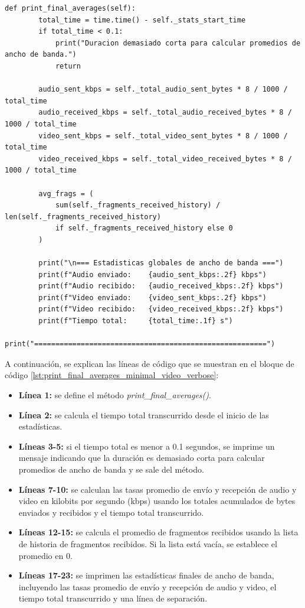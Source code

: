 \begin{lstlisting}[style=pythonstyle, caption={Método print\_final\_averages() de \textit{Minimal\_Video\_verbose}}, label={lst:print_final_averages_minimal_video_verbose}]
def print_final_averages(self):
        total_time = time.time() - self._stats_start_time
        if total_time < 0.1:
            print("Duracion demasiado corta para calcular promedios de ancho de banda.")
            return

        audio_sent_kbps = self._total_audio_sent_bytes * 8 / 1000 / total_time
        audio_received_kbps = self._total_audio_received_bytes * 8 / 1000 / total_time
        video_sent_kbps = self._total_video_sent_bytes * 8 / 1000 / total_time
        video_received_kbps = self._total_video_received_bytes * 8 / 1000 / total_time

        avg_frags = (
            sum(self._fragments_received_history) / len(self._fragments_received_history)
            if self._fragments_received_history else 0
        )

        print("\n=== Estadisticas globales de ancho de banda ===")
        print(f"Audio enviado:    {audio_sent_kbps:.2f} kbps")
        print(f"Audio recibido:   {audio_received_kbps:.2f} kbps")
        print(f"Video enviado:    {video_sent_kbps:.2f} kbps")
        print(f"Video recibido:   {video_received_kbps:.2f} kbps")
        print(f"Tiempo total:     {total_time:.1f} s")
        print("=======================================================")
\end{lstlisting}
\vspace{\baselineskip}

A continuación, se explican las líneas de código que se muestran en el bloque de código \ref{lst:print_final_averages_minimal_video_verbose}:
\begin{itemize}
    \item \textbf{Línea 1:} se define el método \textit{print\_final\_averages()}.
    \item \textbf{Línea 2:} se calcula el tiempo total transcurrido desde el inicio de las estadísticas.
    \item \textbf{Líneas 3-5:} si el tiempo total es menor a 0.1 segundos, se imprime un mensaje indicando que la duración es demasiado corta para calcular promedios de ancho de banda y se sale del método.
    \item \textbf{Líneas 7-10:} se calculan las tasas promedio de envío y recepción de audio y video en kilobits por segundo (kbps) usando los totales acumulados de bytes enviados y recibidos y el tiempo total transcurrido.
    \item \textbf{Líneas 12-15:} se calcula el promedio de fragmentos recibidos usando la lista de historia de fragmentos recibidos. Si la lista está vacía, se establece el promedio en 0.
    \item \textbf{Líneas 17-23:} se imprimen las estadísticas finales de ancho de banda, incluyendo las tasas promedio de envío y recepción de audio y video, el tiempo total transcurrido y una línea de separación.
\end{itemize}

